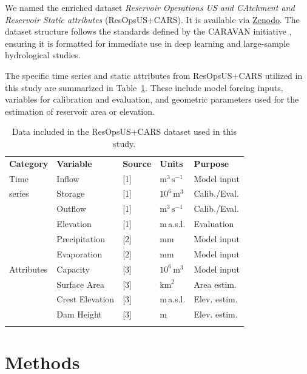 \documentclass[hess, manuscript]{copernicus}
\begin{document}
We named the enriched dataset \textit{Reservoir Operations US and CAtchment and Reservoir Static attributes} (ResOpsUS+CARS). It is available via \href{https://doi.org/10.5281/zenodo.15978041}{Zenodo}. The dataset structure follows the standards defined by the CARAVAN initiative \citep{Kratzert2023}, ensuring it is formatted for immediate use in deep learning and large-sample hydrological studies.

The specific time series and static attributes from ResOpsUS+CARS utilized in this study are summarized in Table~\ref{tab:data}. These include model forcing inputs, variables for calibration and evaluation, and geometric parameters used for the estimation of reservoir area or elevation.

\begin{table}[t]
    \centering
    \caption{Data included in the ResOpsUS+CARS dataset used in this study.}
    \label{tab:data}
    \begin{tabular*}{\columnwidth}{@{\extracolsep{\fill}}lllll}
        \tophline
        \textbf{Category} & \textbf{Variable} & \textbf{Source} & \textbf{Units} & \textbf{Purpose} \\
        \middlehline
        Time & Inflow & [1] & $\text{m}^3\,\text{s}^{-1}$ & Model input \\
        series & Storage & [1] & $10^6\,\text{m}^3$ & Calib./Eval. \\
        & Outflow & [1] & $\text{m}^3\,\text{s}^{-1}$ & Calib./Eval. \\
        & Elevation & [1] & m\,a.s.l. & Evaluation \\
        & Precipitation & [2] & mm & Model input \\
        & Evaporation & [2] & mm & Model input \\
        \middlehline
        Attributes & Capacity & [3] & $10^6\,\text{m}^3$ & Model input \\
        & Surface Area & [3] & $\text{km}^2$ & Area estim. \\
        & Crest Elevation & [3] & m\,a.s.l. & Elev. estim. \\
        & Dam Height & [3] & m & Elev. estim. \\
        \bottomhline
    \end{tabular*}
\end{table}

\section{Methods}
\label{sec:methods}
\end{document}
